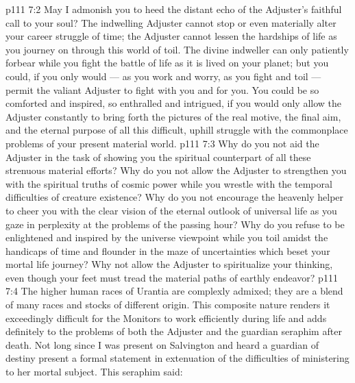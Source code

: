\vs p111 7:2 \pc May I admonish you to heed the distant echo of the Adjuster’s faithful call to your soul? The indwelling Adjuster cannot stop or even materially alter your career struggle of time; the Adjuster cannot lessen the hardships of life as you journey on through this world of toil. The divine indweller can only patiently forbear while you fight the battle of life as it is lived on your planet; but you could, if you only would --- as you work and worry, as you fight and toil --- permit the valiant Adjuster to fight with you and for you. You could be so comforted and inspired, so enthralled and intrigued, if you would only allow the Adjuster constantly to bring forth the pictures of the real motive, the final aim, and the eternal purpose of all this difficult, uphill struggle with the commonplace problems of your present material world.
\vs p111 7:3 Why do you not aid the Adjuster in the task of showing you the spiritual counterpart of all these strenuous material efforts? Why do you not allow the Adjuster to strengthen you with the spiritual truths of cosmic power while you wrestle with the temporal difficulties of creature existence? Why do you not encourage the heavenly helper to cheer you with the clear vision of the eternal outlook of universal life as you gaze in perplexity at the problems of the passing hour? Why do you refuse to be enlightened and inspired by the universe viewpoint while you toil amidst the handicaps of time and flounder in the maze of uncertainties which beset your mortal life journey? Why not allow the Adjuster to spiritualize your thinking, even though your feet must tread the material paths of earthly endeavor?
\vs p111 7:4 The higher human races of Urantia are complexly admixed; they are a blend of many races and stocks of different origin. This composite nature renders it exceedingly difficult for the Monitors to work efficiently during life and adds definitely to the problems of both the Adjuster and the guardian seraphim after death. Not long since I was present on Salvington and heard a guardian of destiny present a formal statement in extenuation of the difficulties of ministering to her mortal subject. This seraphim said:

